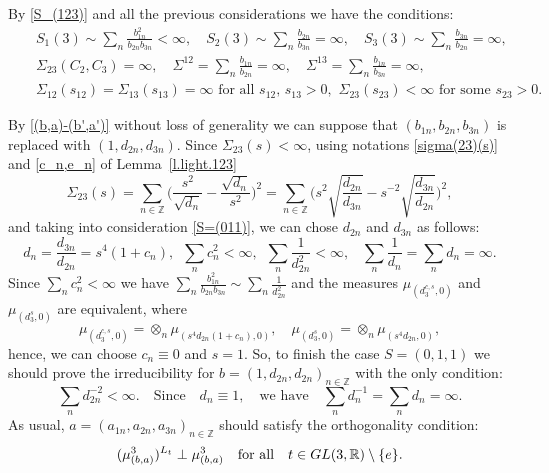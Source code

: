 \documentclass[preprint,12pt]{elsarticle}
\numberwithin{equation}{section}
\begin{document}
By \eqref{S_(123)} and all the previous considerations we have the conditions:
%
\begin{eqnarray}
\nonumber
&&
S_1(3)\!\sim\!\sum_n\frac{b_{1n}^2}{b_{2n}b_{3n}}\!<\!\infty,\quad
S_2(3)\!\sim\!\sum_n\frac{b_{2n}}{b_{3n}}\!=\!\infty,
\quad 
S_3(3)\!\sim\!\sum_n\frac{b_{3n}}{b_{2n}}\!=\!\infty,\\
\label{S=(011)}
&&
 \Sigma_{23}(C_2,C_3)=\infty,\quad 
\Sigma^{12}=\sum_n\frac{b_{1n}}{b_{2n}}=\infty,\quad \Sigma^{13}=\sum_n\frac{b_{1n}}{b_{3n}}=\infty,\\
\nonumber
&&
\Sigma_{12}(s_{12})\!=\!\Sigma_{13}(s_{13})\!=\!\infty\,\,\text{for all}\,\, s_{12},\,s_{13}>0,\,\, \Sigma_{23}(s_{23})\!<\!\infty \,\,\text{for some}\,\, s_{23}>0.
\end{eqnarray}
%
\begin{rem}
  \label{r.(011).(c)}
 By \eqref{(b,a)-(b',a')} without loss of generality we can suppose that  $(b_{1n},b_{2n},b_{3n})$ is replaced with $ (1,d_{2n},d_{3n})$. Since $\Sigma_{23}(s)<\infty$, using notations
 \eqref{sigma(23)(s)} and \eqref{c_n,e_n} of Lemma~\ref{l.light.123} 
$$
\Sigma_{23}(s)\!=\!\sum_{n\in \mathbb Z}\Big(
\frac{s^2}{\sqrt{d_n}}\!-\!
\frac{\sqrt{d_n}}{s^2}\Big)^2\!=\!
\sum_{n\in \mathbb Z}\Big(
s^2\sqrt{\frac{d_{2n}}{d_{3n}}}\!-\!
s^{-2}\sqrt{\frac{d_{3n}}{d_{2n}}}\Big)^2,
$$
and taking into consideration \eqref{S=(011)}, we can chose $d_{2n}$ and     $d_{3n}$ as follows:
\begin{equation}
  \label{last(011)}
d_n\!=\!\frac{d_{3n}}{d_{2n}}\!=\!s^4(1+c_n),\,\,\,\sum_nc^2_{n}<\infty
,\,\,\,\sum_n\frac{1}{d^2_{2n}}<\infty,\,\,\,\,\,\sum_n\frac{1}{d_{n}}=\sum_n d_{n}\!=\!\infty.
\end{equation}
Since $\sum_nc^2_{n}<\infty$ 
we have 
$\sum_n\frac{b_{1n}^2}{b_{2n}b_{3n}}\sim \sum_n\frac{1}{d^2_{2n}}$ and
the measures 
$\mu_{(d^{c,s}_3,0)}$ and $\mu_{(d^s_3,0)}$ are equivalent, where
$$
\mu_{(d^{c,s}_3,0)}=\otimes_n\mu_{(s^4d_{2n}(1+c_n),0)},\quad
\mu_{(d^s_3,0)}=\otimes_n\mu_{(s^4d_{2n},0)},
$$
hence, we can choose $c_n\equiv0$ and $s=1$.
% 
So, to finish the case $S=(0,1,1)$ we should prove the irreducibility for 
$b=(1,d_{2n},d_{2n})_{n\in \mathbb Z}$
with the only condition: 
\begin{equation}
%
\label{last(011)(2=3)}
\sum_nd^{-2}_{2n}<\infty. \quad\text{Since}\quad d_{n}\equiv 1,\quad \text{we have}\quad
\sum_nd^{-1}_{n}=\sum_n d_{n}\!=\!\infty.
%
\end{equation}
As usual, $a=(a_{1n},a_{2n},a_{3n})_{n\in \mathbb Z}$  should satisfy the orthogonality condition: 
\begin{equation*}
(\mu_{(b,a)}^3)^{L_t}\perp\mu_{(b,a)}^3\quad\text{for all}\quad  t\in {\rm GL}(3,{\mathbb R})\setminus\{e\}.                                                                                                                                          \end{equation*}
\end{rem}
\end{document}
